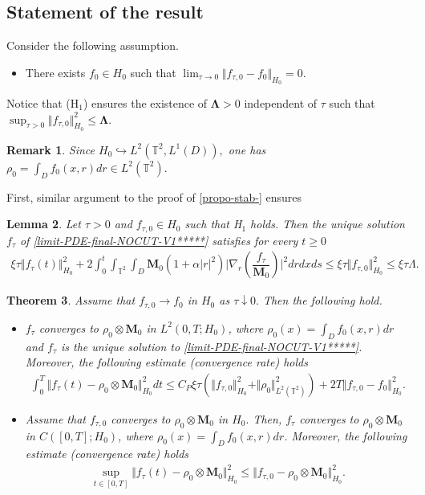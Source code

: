 \documentclass[a4paper,12pt, reqno]{amsart}
\newtheorem{theorem}{Theorem}
\newtheorem{lemma}[theorem]{Lemma}
\newtheorem{remark}[theorem]{Remark}
\newcommand{\M}{\mathbf{M}}
\begin{document}
\subsection*{Statement of the result}
Consider the following assumption.
\begin{itemize}
    \item[(H$_1$)] There exists $f_0\in H_0$ such that      $       \displaystyle\lim_{\tau\to 0}\Vert f_{\tau,0}-f_0\Vert_{H_0} =0.  $
\end{itemize}
Notice that (H$_1$) ensures  the existence of  $\mathbf{\Lambda}>0$ independent of $\tau$  such that $\displaystyle\sup_{\tau>0}\Vert f_{\tau,0} \Vert_{H_0}^2\leq  \mathbf{\Lambda}.$
\begin{remark}
    Since $H_0 \hookrightarrow L^2(\mathbb{T}^2,L^1(D)),$ one has $\rho_0=\int_D f_0(x,r) dr\in L^2(\mathbb{T}^2).$
\end{remark}
First, similar argument to the proof of \autoref{propo-stab-} ensures
\begin{lemma}\label{lem-estimate-tau-limit}
  Let $\tau>0$ and    $f_{\tau,0}\in H_0$ such that H$_1$ holds. Then the  unique solution $f_\tau$ of \eqref{limit-PDE-final-NOCUT-V1*****} satisfies for every $t\ge 0$
     \begin{align}
          \xi\tau\Vert f_\tau(t)\Vert_{H_0}^2+2\int_0^t\int_{\mathbb{T}^2}\int_D \mathbf{M}_0 (1+\alpha\vert r\vert^2)\vert \nabla_r(\dfrac{f_\tau}{\mathbf{M}_0})\vert^2 drdxds \leq   \xi\tau\Vert f_{\tau, 0}\Vert_{H_0}^2\leq \xi\tau\Lambda.
      \end{align}
\end{lemma}
\begin{theorem}\label{Thm-singular-limit-PF}
    Assume that $f_{\tau, 0} \to f_0$ in $H_0$ as $\tau \downarrow 0.$ Then the following  hold.
    \begin{itemize}
        \item $ f_\tau$ converges to 
        $ \rho_0\otimes \M_0$ in $L^2(0,T;H_0)$, 
     where  $\rho_0(x)=\int_D f_0(x,r) dr$ and $f_\tau$ is the unique solution  to \eqref{limit-PDE-final-NOCUT-V1*****}. Moreover, the following estimate (convergence rate) holds
              \begin{align}\label{ineq-converg-equi}
 \int_0^T  \Vert f_{\tau}(t)-\rho_0\otimes \mathbf{M}_0\Vert_{H_0}^2 dt \leq C_P  \xi\tau (\Vert f_{\tau, 0}\Vert_{H_0}^2+\Vert \rho_0 \Vert^2_{L^2(\mathbb{T}^2)})+2T\Vert f_{\tau,0}-f_0\Vert_{H_0}^2.
          \end{align}
          \item Assume that $f_{\tau,0}$ converges to $ \rho_{0}\otimes\mathbf{M}_0$ in $H_0.$ Then,  $ f_\tau$ converges to 
        $ \rho_0\otimes \M_0$ in $C([0,T];H_0)$, 
     where  $\rho_0(x)=\int_D f_0(x,r) dr$. Moreover, the following estimate (convergence rate) holds
     \begin{align}\label{ineq-conv-equi-Cont}
         \displaystyle\sup_{t\in [0,T]}\Vert f_{\tau}(t)-\rho_0\otimes \mathbf{M}_0\Vert_{H_0}^2 \leq   \Vert f_{\tau,0}- \rho_{0}\otimes\mathbf{M}_0\Vert_{H_0}^2.
     \end{align}
    \end{itemize}
  
\end{theorem}
\end{document}
